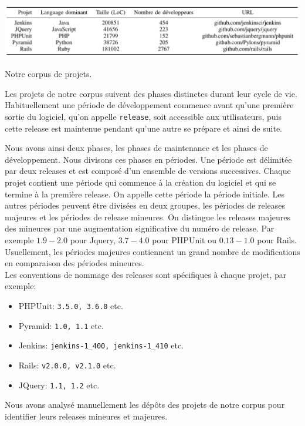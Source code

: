 \begin{table}[h]
	\centering
	\includegraphics[scale=0.204]{data/tables/VCS.png}
	\caption{Notre corpus de projets.}
	\label{tab:vcs}
\end{table}

Les projets de notre corpus suivent des phases distinctes durant leur cycle de vie. Habituellement une période de développement commence avant qu'une première sortie du logiciel, qu'on appelle \texttt{release}, soit accessible aux utilisateurs, puis cette release est maintenue pendant qu'une autre se prépare et ainsi de suite.

Nous avons ainsi deux phases, les phases de maintenance et les phases de développement. Nous divisons ces phases en périodes. Une période est délimitée par deux releases et est composé d'un ensemble de versions successives. Chaque projet contient une période qui commence à la création du logiciel et qui se termine à la première release. On appelle cette période la période initiale. Les autres périodes peuvent être divisées en deux groupes, les périodes de releases majeures et les périodes de release mineures. On distingue les releases majeures des mineures par une augmentation significative du numéro de release. Par exemple $1.9-2.0$ pour Jquery, $3.7-4.0$ pour PHPUnit ou $0.13-1.0$ pour Rails. Usuellement, les périodes majeures contiennent un grand nombre de modifications en comparaison des périodes mineures.\\

Les conventions de nommage des releases sont spécifiques à chaque projet, par exemple:
\begin{itemize}
\item PHPUnit: \texttt{3.5.0, 3.6.0} etc.
\item Pyramid: \texttt{1.0, 1.1} etc.
\item Jenkins: \texttt{jenkins-1\_400, jenkins-1\_410} etc.
\item Rails: \texttt{v2.0.0, v2.1.0} etc.
\item JQuery: \texttt{1.1, 1.2} etc.
\end{itemize}
Nous avons analysé manuellement les dépôts des projets de notre corpus pour identifier leurs releases mineures et majeures.\\

